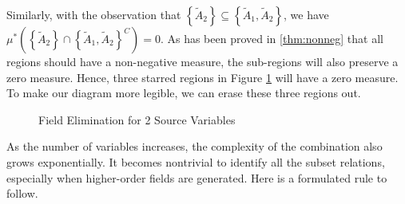 

Similarly, with the observation that $\left\{ \tilde{A}_2 \right\} \subseteq \left\{\tilde{A}_1, \tilde{A}_2 \right\}$, we have $\mu^{*}\left( \left\{ \tilde{A}_2 \right\} \cap \left\{\tilde{A}_1, \tilde{A}_2 \right\}^{C} \right) = 0$. As has been proved in \ref{thm:nonneg} that all regions should have a non-negative measure, the sub-regions will also preserve a zero measure. Hence, three starred regions in Figure \ref{fig:elim3} will have a zero measure. To make our diagram more legible, we can erase these three regions out.


\begin{figure}
\centering
{}%
%
\centering
\caption{Field Elimination for 2 Source Variables}
\label{fig:elim3}
\end{figure}

As the number of variables increases, the complexity of the combination also grows exponentially. It becomes nontrivial to identify all the subset relations, especially when higher-order fields are generated. Here is a formulated rule to follow.

